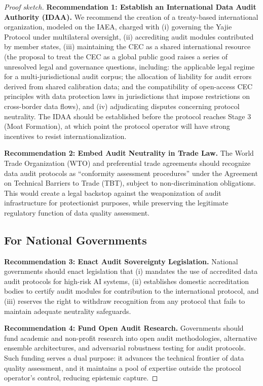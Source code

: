 \documentclass[12pt,a4paper]{ctexart}
\theoremstyle{definition}
\theoremstyle{remark}
\begin{document}
\begin{proof}[Proof sketch]
\textbf{Recommendation 1: Establish an International Data Audit Authority (IDAA).} We recommend the creation of a treaty-based international organization, modeled on the IAEA, charged with (i) governing the Yajie Protocol under multilateral oversight, (ii) accrediting audit modules contributed by member states, (iii) maintaining the CEC as a shared international resource (the proposal to treat the CEC as a global public good raises a series of unresolved legal and governance questions, including: the applicable legal regime for a multi-jurisdictional audit corpus; the allocation of liability for audit errors derived from shared calibration data; and the compatibility of open-access CEC principles with data protection laws in jurisdictions that impose restrictions on cross-border data flows), and (iv) adjudicating disputes concerning protocol neutrality. The IDAA should be established before the protocol reaches Stage 3 (Moat Formation), at which point the protocol operator will have strong incentives to resist internationalization.

\textbf{Recommendation 2: Embed Audit Neutrality in Trade Law.} The World Trade Organization (WTO) and preferential trade agreements should recognize data audit protocols as ``conformity assessment procedures'' under the Agreement on Technical Barriers to Trade (TBT), subject to non-discrimination obligations. This would create a legal backstop against the weaponization of audit infrastructure for protectionist purposes, while preserving the legitimate regulatory function of data quality assessment.

\subsection{For National Governments}

\textbf{Recommendation 3: Enact Audit Sovereignty Legislation.} National governments should enact legislation that (i) mandates the use of accredited data audit protocols for high-risk AI systems, (ii) establishes domestic accreditation bodies to certify audit modules for contribution to the international protocol, and (iii) reserves the right to withdraw recognition from any protocol that fails to maintain adequate neutrality safeguards.

\textbf{Recommendation 4: Fund Open Audit Research.} Governments should fund academic and non-profit research into open audit methodologies, alternative ensemble architectures, and adversarial robustness testing for audit protocols. Such funding serves a dual purpose: it advances the technical frontier of data quality assessment, and it maintains a pool of expertise outside the protocol operator's control, reducing epistemic capture.


\end{proof}
\end{document}

